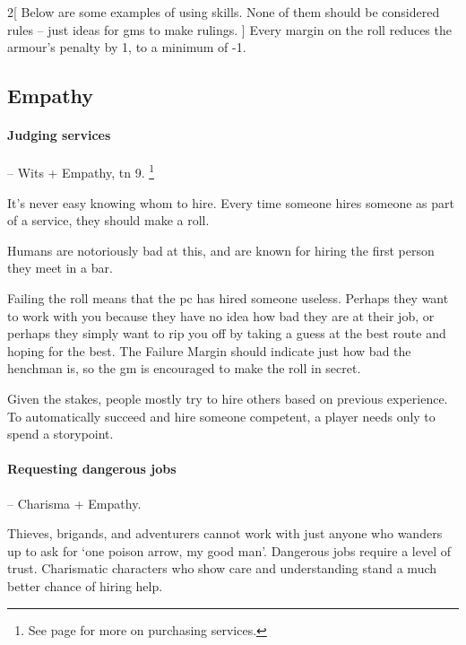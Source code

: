 \begin{multicols}{2}[
  Below are some examples of using skills.
  None of them should be considered rules -- just ideas for \glspl{gm} to make rulings.
]
Every margin on the roll reduces the armour's penalty by 1, to a minimum of -1.

\subsection{Empathy}

\paragraph{Judging services} -- Wits + Empathy, \gls{tn} 9.
\footnote{See page \pageref{services} for more on purchasing services.}

It's never easy knowing whom to hire.
Every time someone hires someone as part of a service, they should make a roll.

Humans are notoriously bad at this, and are known for hiring the first person they meet in a bar.

Failing the roll means that the \gls{pc} has hired someone useless.
Perhaps they want to work with you because they have no idea how bad they are at their job, or perhaps they simply want to rip you off by taking a guess at the best route and hoping for the best.
The Failure Margin should indicate just how bad the henchman is, so the \gls{gm} is encouraged to make the roll in secret.

Given the stakes, people mostly try to hire others based on previous experience.
To automatically succeed and hire someone competent, a player needs only to spend a \gls{storypoint}.

\paragraph{Requesting dangerous jobs} -- Charisma + Empathy.


Thieves, brigands, and \iftoggle{aif}{illegal}{} adventurers cannot work with just anyone who wanders up to ask for `one poison arrow, my good man'.
Dangerous jobs require a level of trust.
Charismatic characters who show care and understanding stand a much better chance of hiring help.


\end{multicols}
